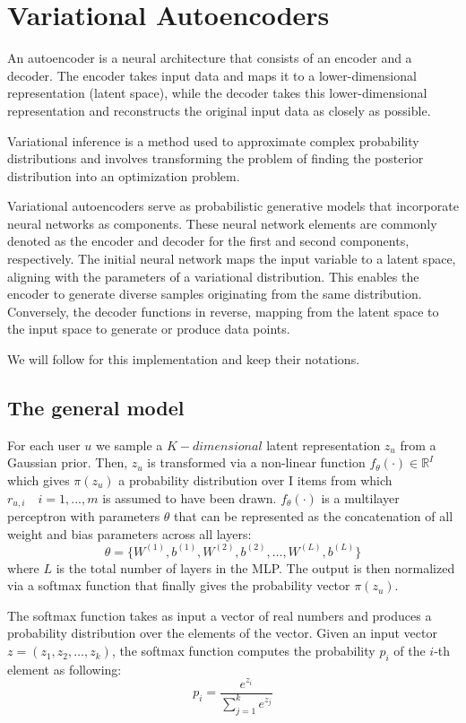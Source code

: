 \chapter{Variational Autoencoders} \label{chap:vae}

An autoencoder is a neural architecture that consists of an encoder and a decoder. The encoder takes input data and maps it to a lower-dimensional representation (latent space), while the decoder takes this lower-dimensional representation and reconstructs the original input data as closely as possible.

Variational inference is a method used to approximate complex probability distributions and involves transforming the problem of finding the posterior distribution into an optimization problem.

Variational autoencoders serve as probabilistic generative models that incorporate neural networks as components. These neural network elements are commonly denoted as the encoder and decoder for the first and second components, respectively. The initial neural network maps the input variable to a latent space, aligning with the parameters of a variational distribution. This enables the encoder to generate diverse samples originating from the same distribution. Conversely, the decoder functions in reverse, mapping from the latent space to the input space to generate or produce data points.

We will follow \cite{liang2018variational} for this implementation and keep their notations.

\section{The general model}

For each user $u$ we sample a $K-dimensional$ latent representation $z_u$ from a Gaussian prior. Then, $z_u$ is transformed via a non-linear function $f_{\theta}( \cdot ) \in \mathbb{R}^I$ which gives $\pi(z_u)$ a probability distribution over I items from which $r_{u,i} \quad i=1,...,m$ is assumed to have been drawn. $f_{\theta}( \cdot )$ is a multilayer perceptron with parameters $\theta$ that can be represented as the concatenation of all weight and bias parameters across all layers:
\[
\theta=\{W^{(1)},b^{(1)},W^{(2)},b^{(2)},…,W^{(L)},b^{(L)}\}
\]
where $L$ is the total number of layers in the MLP. The output is then normalized via a softmax function that finally gives the probability vector $\pi(z_u)$.

The softmax function takes as input a vector of real numbers and produces a probability distribution over the elements of the vector. Given an input vector $z=(z_1,z_2,…,z_k)$, the softmax function computes the probability $p_i$ of the $i$-th element as following:
\[
p_i= \frac{e^{z_i}}{\sum_{j=1}^k e^{z_j}}
\]

